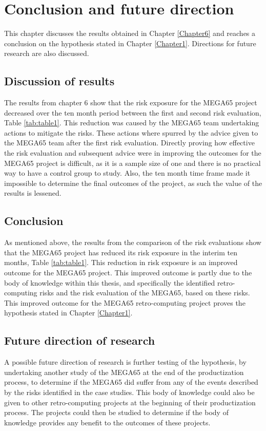 
\chapter{Conclusion and future direction}
\label{Chapter7}
This chapter discusses the results obtained in Chapter \ref{Chapter6} and reaches a conclusion on the hypothesis stated in Chapter \ref{Chapter1}. Directions for future research are also discussed.

\section{Discussion of results}
The results from chapter 6 show that the risk exposure for the MEGA65 project decreased over the ten month period between the first and second risk evaluation, Table \ref{tab:table1}. This reduction was caused by the MEGA65 team undertaking actions to mitigate the risks. These actions where spurred by the advice given to the MEGA65 team after the first risk evaluation. Directly proving how effective the risk evaluation and subsequent advice were in improving the outcomes for the MEGA65 project is difficult, as it is a sample size of one and there is no practical way to have a control group to study. Also, the ten month time frame made it impossible to determine the final outcomes of the project, as such the value of the results is lessened.

\section{Conclusion}
As mentioned above, the results from the comparison of the risk evaluations show that the MEGA65 project has reduced its risk exposure in the interim ten months, Table \ref{tab:table1}. This reduction in risk exposure is an improved outcome for the MEGA65 project. This improved outcome is partly due to the body of knowledge within this thesis, and specifically the identified retro-computing risks and the risk evaluation of the MEGA65, based on these risks. This improved outcome for the MEGA65 retro-computing project proves the hypothesis stated in Chapter \ref{Chapter1}.

\section{Future direction of research}
A possible future direction of research is further testing of the hypothesis, by undertaking another study of the MEGA65 at the end of the productization process, to determine if the MEGA65 did suffer from any of the events described by the risks identified in the case studies. This body of knowledge could also be given to other retro-computing projects at the beginning of their productization process. The projects could then be studied to determine if the body of knowledge provides any benefit to the outcomes of these projects.

